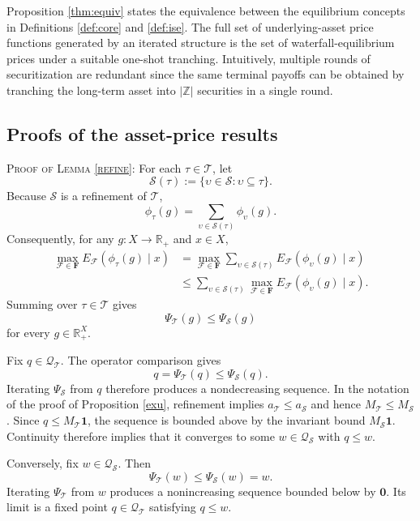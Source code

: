 \documentclass[11pt]{article}
\theoremstyle{plain}
\begin{document}
Proposition \ref{thm:equiv} states the equivalence between the equilibrium concepts in Definitions \ref{def:core} and \ref{def:ise}. The full set of underlying-asset price functions generated by an iterated structure is the set of waterfall-equilibrium prices under a suitable one-shot tranching. Intuitively, multiple rounds of securitization are redundant since the same terminal payoffs can be obtained by tranching the long-term asset into $|\mathbb{Z}|$ securities in a single round.

\subsection{Proofs of the asset-price results}\label{app:asset-price-proofs}

\textsc{Proof of Lemma \ref{refine}}:
For each $\tau\in\mathcal{T}$, let
\[
\mathcal{S}(\tau):=\{\upsilon\in\mathcal{S}:\upsilon\subseteq\tau\}.
\]
Because $\mathcal{S}$ is a refinement of $\mathcal{T}$,
\[
\phi_\tau(g)=\sum_{\upsilon\in\mathcal{S}(\tau)}\phi_\upsilon(g).
\]
Consequently, for any $g:X\to\mathbb{R}_+$ and $x\in X$,
\begin{align*}
\max_{\mathcal{F}\in\mathbf{F}}
E_{\mathcal{F}}\left(\phi_\tau(g)\mid x\right)
&=
\max_{\mathcal{F}\in\mathbf{F}}
\sum_{\upsilon\in\mathcal{S}(\tau)}
E_{\mathcal{F}}\left(\phi_\upsilon(g)\mid x\right)\\
&\leq
\sum_{\upsilon\in\mathcal{S}(\tau)}
\max_{\mathcal{F}\in\mathbf{F}}
E_{\mathcal{F}}\left(\phi_\upsilon(g)\mid x\right).
\end{align*}
Summing over $\tau\in\mathcal{T}$ gives
\[
\Psi_{\mathcal{T}}(g)\leq\Psi_{\mathcal{S}}(g)
\]
for every $g\in\mathbb{R}_+^X$.

Fix $q\in\mathcal{Q}_{\mathcal{T}}$. The operator comparison gives
\[
q=\Psi_{\mathcal{T}}(q)\leq\Psi_{\mathcal{S}}(q).
\]
Iterating $\Psi_{\mathcal{S}}$ from $q$ therefore produces a nondecreasing sequence. In the notation of the proof of Proposition \ref{exu}, refinement implies $a_{\mathcal{T}}\leq a_{\mathcal{S}}$ and hence $M_{\mathcal{T}}\leq M_{\mathcal{S}}$. Since $q\leq M_{\mathcal{T}}\mathbf{1}$, the sequence is bounded above by the invariant bound $M_{\mathcal{S}}\mathbf{1}$. Continuity therefore implies that it converges to some $w\in\mathcal{Q}_{\mathcal{S}}$ with $q\leq w$.

Conversely, fix $w\in\mathcal{Q}_{\mathcal{S}}$. Then
\[
\Psi_{\mathcal{T}}(w)\leq\Psi_{\mathcal{S}}(w)=w.
\]
Iterating $\Psi_{\mathcal{T}}$ from $w$ produces a nonincreasing sequence bounded below by $\mathbf{0}$. Its limit is a fixed point $q\in\mathcal{Q}_{\mathcal{T}}$ satisfying $q\leq w$.
\end{document}
